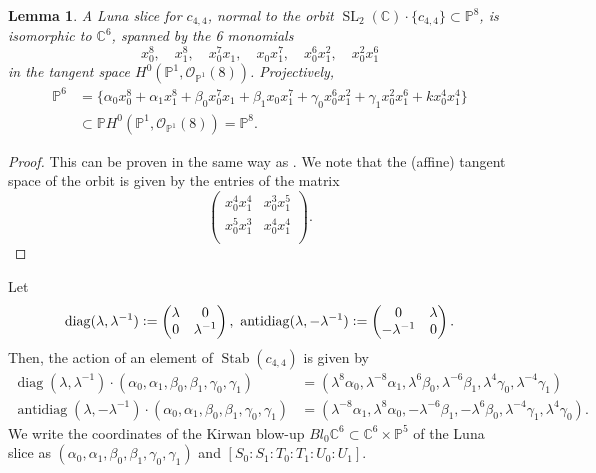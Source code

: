 \documentclass[12pt, pdftex]{amsart}
\theoremstyle{plain}
\newtheorem{lem}[thm]{Lemma}
\theoremstyle{definition}
\numberwithin{equation}{section}
\def\C{{\mathbb C}}
\def\P{{\mathbb P}}
\def\SL{\mathop{\mathrm{SL}}\nolimits}
\def\Stab{\mathop{\mathrm{Stab}}\nolimits}
\def\diag{\mathop{\mathrm{diag}}\nolimits}
\def\antidiag{\mathop{\mathrm{antidiag}}\nolimits}
\def\g{\mathfrak{g}}
\def\OO{\mathscr{O}}
\def\a{\alpha}
\def\b{\beta}
\def\g{\gamma}
\newcommand{\defeq}{\vcentcolon=}
\begin{document}
\begin{lem}
\label{lem:Luna_slice}
A Luna slice for $c_{4,4}$, normal to the orbit $\SL_2(\C)\cdot \{c_{4,4}\}\subset\P^8$, 
is isomorphic to $\C^6$, spanned by the 6 monomials 
\[x_0^8, \quad x_1^8,\quad x_0^7x_1,\quad x_0x_1^7,\quad x_0^6x_1^2,\quad x_0^2x_1^6\]
in the tangent space $H^0(\P^1, \OO_{\P^1}(8))$.
Projectively, 
\begin{align*}
    \P^6&=\{\a_0x_0^8+\a_1x_1^8+\b_0x_0^7x_1+\b_1 x_0x_1^7+\g_0x_0^6x_1^2+\g_1x_0^2x_1^6+kx_0^4x_1^4\}\\
    &\subset \P H^0(\P^1,\OO_{\P^1}(8)) =\P^8.
\end{align*}
\end{lem}
\begin{proof}
This can be proven in the same way as \cite[Subsection 4.3.1]{CMGHL19}.
We note that the (affine) tangent space of the orbit  is given by the entries of the matrix
\[\begin{pmatrix}
x_0^4x_1^4 & x_0^3x_1^5 \\
x_0^5x_1^3 & x_0^4x_1^4 \\
\end{pmatrix}.
\]
\end{proof}
Let \[\diag(\lambda,\lambda^{-1})\defeq
\begin{pmatrix}
\lambda & 0 \\
0 & \lambda^{-1} \\
\end{pmatrix},\ 
\antidiag(\lambda,-\lambda^{-1})\defeq
\begin{pmatrix}
0 & \lambda \\
-\lambda^{-1} & 0 \\
\end{pmatrix}.
\]
Then, the action of an element of $\Stab(c_{4,4})$ is given by  
\begin{align}
\label{eq:action_diag}
    \diag(\lambda,\lambda^{-1})\cdot(\a_0,\a_1,\b_0,\b_1,\g_0,\g_1)&=(\lambda^8\a_0,\lambda^{-8}\a_1,\lambda^6\b_0,\lambda^{-6}\b_1,\lambda^4\g_0,\lambda^{-4}\g_1)\\
\label{eq:action_anti_diag}
    \antidiag(\lambda,-\lambda^{-1})\cdot(\a_0,\a_1,\b_0,\b_1,\g_0,\g_1)&=(\lambda^{-8}\a_1,\lambda^8\a_0, -\lambda^{-6}\b_1,-\lambda^6\b_0,\lambda^{-4}\g_1,\lambda^4\g_0).
\end{align}
We write the coordinates of the Kirwan blow-up $Bl_0\C^6\subset\C^6\times\P^5$ of the Luna slice as $(\a_0, \a_1, \b_0, \b_1, \g_0, \g_1)$ and $[S_0:S_1:T_0:T_1:U_0:U_1]$.
\end{document}
